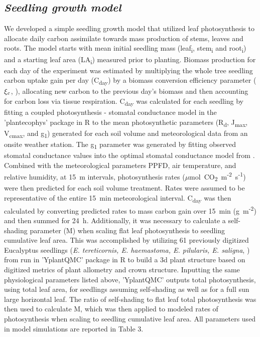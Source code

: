 \documentclass[a4paper]{article}\usepackage[]{graphicx}\usepackage[]{color}
\begin{document}
\subsection*{\textit{Seedling growth model}}
We developed a simple seedling growth model that utilized leaf photosynthesis to allocate daily carbon assimilate towards mass production of stems, leaves and roots. The model starts with mean initial seedling mass (leaf\textsubscript{i}, stem\textsubscript{i} and root\textsubscript{i}) and a starting leaf area (LA\textsubscript{i}) measured prior to planting. Biomass production for each day of the experiment was estimated by multiplying the whole tree seedling carbon uptake gain per day (C\textsubscript{day}) by a biomass conversion efficiency parameter ($\xi\textsubscript{c}$, \citet{zhu2008maximum}), allocating new carbon to the previous day’s biomass and then accounting for carbon loss via tissue respiration. C\textsubscript{day} was calculated for each seedling by fitting a coupled photosynthesis - stomatal conductance model \citep{farquhar1980biochemical,farquhar1982stomatal,medlyn2002temperature} in the 'plantecophys' package in R \citep{plantecophys} to the mean photosynthetic parameters (R\textsubscript{d}, J\textsubscript{max}, V\textsubscript{cmax}, and g\textsubscript{1}) generated for each soil volume and meteorological data from an onsite weather station.  The g\textsubscript{1} parameter was generated by fitting observed stomatal conductance values into the optimal stomatal conductance model from \citep{medlyn2012reconciling}. Combined with the meteorological parameters PPFD, air temperature, and relative humidity, at 15~m intervals, photosynthesis rates ($\mu$mol~CO\textsubscript{2}~m\textsuperscript{-2}~s\textsuperscript{-1}) were then predicted for each soil volume treatment. Rates were assumed to be representative of the entire 15~min meteorological interval. C\textsubscript{day} was then calculated by converting predicted rates to mass carbon gain over 15~min (g~m\textsuperscript{-2}) and then summed for 24~h. Additionally, it was necessary to calculate a self-shading parameter (M) when scaling flat leaf photosynthesis to seedling cumulative leaf area.  This was accomplished by utilizing 61 previously digitized Eucalyptus seedlings (\textit{E. tereticornis, E. haemastoma, E. pilularis, E. saligna}, \citep{duursma2012light}) from run in 'YplantQMC' package in R \citep{yplantqmc} to build a 3d plant structure based on digitized metrics of plant allometry and crown structure. Inputting the same physiological parameters listed above, 'YplantQMC' outputs total photosynthesis, using total leaf area, for seedlings assuming self-shading as well as for a full sun large horizontal leaf.  The ratio of self-shading to flat leaf total photosynthesis was then used to calculate M, which was then applied to modeled rates of photosynthesis when scaling to seedling cumulative leaf area. All parameters used in model simulations are reported in Table 3.
\end{document}
